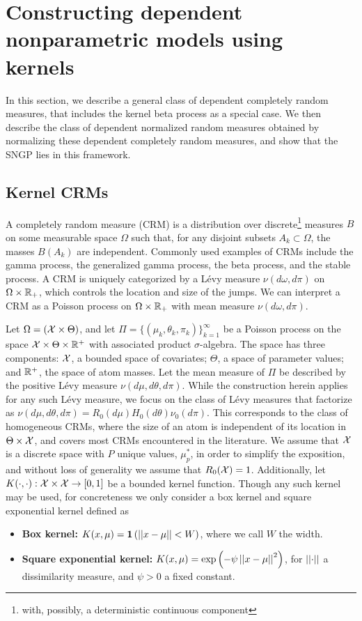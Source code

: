 \section{Constructing dependent nonparametric models using kernels}\label{sec:dep}

In this section, we describe a general class of dependent completely random
measures, that includes the kernel beta process as a special case. We then
describe the class of dependent normalized random measures obtained by
normalizing these dependent completely random measures, and show that the SNGP
lies in this framework.

\subsection{Kernel CRMs}
A completely random measure (CRM) \cite{Kingman:1967,LijoiPrunster:2009} is a distribution over
discrete\footnote{with, possibly, a deterministic continuous component} measures
$B$ on some measurable space $\Omega$ such that, for any disjoint subsets
$A_k\subset\Omega$, the masses $B(A_k)$ are independent. Commonly used examples of
CRMs include the gamma process, the generalized gamma process, the beta process,
and the stable process. A CRM is uniquely categorized by a L\'{e}vy measure
$\nu(d\omega,d\pi)$ on $\Omega\times\mathbb{R}_+$, which controls the location and size of the
jumps. We can interpret a CRM as a Poisson process on $\Omega\times\mathbb{R}_+$
with mean measure $\nu(d\omega,d\pi)$.

Let $\Omega = (\mathcal{X} \times \Theta)$, and let $\Pi = \{(\mu_k,\theta_k,\pi_k)\}_{k=1}^\infty$ be a Poisson process on the
space $\mathcal{X} \times \Theta \times \mathbb{R}^+$ with associated product $\sigma$-algebra.  The space has
three components: $\mathcal{X}$, a bounded space of covariates; $\Theta$, a space of
parameter values; and $\mathbb{R}^+$, the space of atom masses.  Let the 
mean measure of $\Pi$ be described by the positive L\'evy
measure $\nu(d\mu,d\theta,d\pi)$.  While the construction herein applies for
any such L\'evy measure, we focus on the class of L\'evy measures that
factorize as $\nu(d\mu,d\theta,d\pi) = R_0(d\mu)H_0(d\theta)\nu_0(d\pi)$.  This
corresponds to the class of homogeneous CRMs, where the size of an atom is
independent of its location in $\Theta \times \mathcal{X}$, and covers most CRMs
encountered in the literature.  We assume that $\mathcal{X}$ is a discrete space with
$P$ unique values, $\mu^*_p$, in order to simplify the exposition, and without
loss of generality we assume that $R_0(\mathcal{X})=1$.  Additionally,
let $K(\cdot,\cdot) : \mathcal{X} \times \mathcal{X} \rightarrow [0,1]$ be a bounded kernel
function.  Though any such kernel may be used, for
concreteness we only consider a box kernel and square exponential kernel
defined as
\begin{itemize}
  \item{\textbf{Box kernel:}}
    $K(x,\mu) = \mathbf 1 \left ( \left | \left | x-\mu \right | \right | < W \right )$, where we call $W$ the width.
  \item{\textbf{Square exponential kernel:}}
    $K(x,\mu) = \exp \left ( -\psi \left | \left | x-\mu \right | \right |^2 \right )$, for 
    $\left | \left | \cdot \right | \right |$ a dissimilarity measure, and $\psi > 0$ a fixed
    constant.
\end{itemize}


